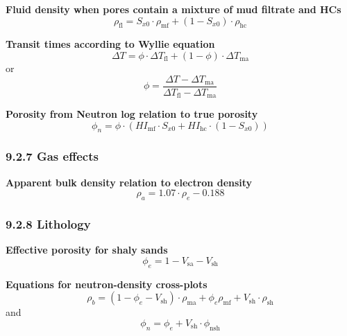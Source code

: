 \textbf{Fluid density when pores contain a mixture of mud filtrate and HCs}
\begin{equation*}
    \rho_\mathrm{fl} = S_{x0}\cdot\rho_\mathrm{mf} + (1 - S_{x0})\cdot\rho_\mathrm{hc}\tag{9A.3}
\end{equation*}

\textbf{Transit times according to Wyllie equation}
\begin{equation*}
    \Delta T = \phi\cdot\Delta T_\mathrm{fl} + (1 - \phi)\cdot\Delta T_\mathrm{ma}\tag{9A.4}
\end{equation*}
or
\begin{equation*}
    \phi = \frac{\Delta T - \Delta T_\mathrm{ma}}{\Delta T_\mathrm{fl} - \Delta T_\mathrm{ma}}\tag{9A.5}
\end{equation*}

\textbf{Porosity from Neutron log relation to true porosity}
\begin{equation*}
    \phi_n = \phi\cdot\left( \mathit{HI}_\mathrm{mf}\cdot S_{x0} + \mathit{HI}_\mathrm{hc}\cdot(1 - S_{x0}) \right)
\end{equation*}

\subsubsection{9.2.7 Gas effects}
\textbf{Apparent bulk density relation to electron density}
\begin{equation*}
    \rho_a = 1.07\cdot\rho_e - 0.188
\end{equation*}

\subsubsection{9.2.8 Lithology}
\textbf{Effective porosity for shaly sands}
\begin{equation*}
    \phi_e = 1 - V_\mathrm{sa} - V_\mathrm{sh}\tag{9A.6}
\end{equation*}

\textbf{Equations for neutron-density cross-plots}
\begin{equation*}
    \rho_b = (1 - \phi_e - V_\mathrm{sh})\cdot\rho_\mathrm{ma} + \phi_e\rho_\mathrm{mf} + V_\mathrm{sh}\cdot\rho_\mathrm{sh}\tag{9A.7}
\end{equation*}
and
\begin{equation*}
    \phi_n = \phi_e + V_\mathrm{sh}\cdot\phi_\mathrm{nsh}\tag{9A.8}
\end{equation*}

